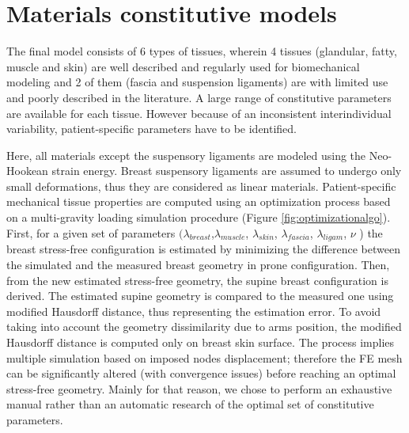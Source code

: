 \section{Materials constitutive models}
\label{section:myConstitutivModels}

The final model consists of 6 types of tissues, wherein 4 tissues (glandular, fatty, muscle and skin) are well described and regularly used for biomechanical modeling and 2 of them (fascia and suspension ligaments) are with limited use and poorly described in the literature. A large range of constitutive parameters are available for each tissue. However because of an inconsistent interindividual variability, patient-specific parameters have to be identified.  


 Here, all materials except the suspensory ligaments are modeled using the Neo-Hookean strain energy. Breast suspensory ligaments are assumed to undergo only small deformations, thus they are considered as linear materials.  Patient-specific mechanical tissue properties are computed using an optimization process based on a multi-gravity loading simulation procedure (Figure \ref{fig:optimizationalgo}). First, for a given set of parameters $(\lambda_{breast}$,$ \lambda_{muscle}$,  $\lambda_{skin}$, $\lambda_{fascia}$, $\lambda_{ligam}$, $\nu$ ) the breast stress-free configuration is estimated by minimizing the difference between the simulated and the measured breast geometry in prone configuration. Then, from the new estimated stress-free geometry, the supine breast configuration is derived. The estimated supine geometry is compared to the measured one using modified Hausdorff distance, thus representing the estimation error.  To avoid taking into account the geometry dissimilarity due to arms position, the modified Hausdorff distance is computed only on breast skin surface.  
The process implies multiple simulation based on imposed nodes displacement; therefore the FE mesh can be significantly altered (with convergence issues) before reaching an optimal stress-free geometry. Mainly for that reason, we chose to perform an exhaustive manual rather than an automatic research of the optimal set of constitutive parameters. 


